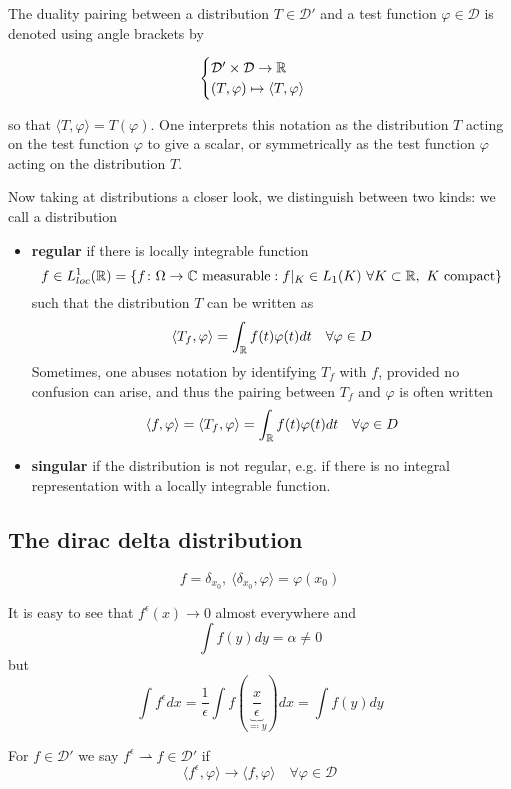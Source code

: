 The duality pairing between a distribution $T \in \mathcal{D}'$ and a test function $\varphi \in \mathcal{D}$ is denoted using angle brackets by

	\[ \begin{cases} \mathcal{D}' \times \mathcal{D} \to \mathbb{R} \\ (T, \varphi) \mapsto \langle T, \varphi \rangle \end{cases} \]
	
so that $\langle T , \varphi \rangle = T(\varphi)$. One interprets this notation as the distribution $T$ acting on the test function $\varphi$ to give a scalar, or symmetrically as the test function $\varphi$ acting on the distribution $T$.	
\newline

Now taking at distributions a closer look, we distinguish between two kinds:
we call a distribution 
\begin{itemize}
	\item \textbf{regular} if there is locally integrable function 
		\[ f \in L_{loc}^{1}(\mathbb{R}) = \{ f \colon \Omega \to \mathbb{C} \text{ measurable} : f|_{K} \in L_{1}(K) ~ \forall K \subset \mathbb{R}, ~K \text{ compact} \} \]
		such that the distribution $T$ can be written as 
		\[ \langle T_{f} , \varphi \rangle = \int_{\mathbb{R}} f(t) \varphi(t) dt \quad \forall \varphi \in D \]
		Sometimes, one abuses notation by identifying $T_{f}$ with $f$, provided no confusion can arise, and thus the pairing between $T_{f}$ and $\varphi$ is often written
		\[ \langle f, \varphi \rangle = \langle T_{f} , \varphi \rangle = \int_{\mathbb{R}} f(t) \varphi(t) dt \quad \forall \varphi \in D \]
	\item \textbf{singular} if the distribution is not regular, e.g. if there is no integral representation with a locally integrable function.
\end{itemize}

\subsection{The dirac delta distribution}

	\[ f = \delta_{x_{0}}, ~ \langle \delta_{x_{0}} , \varphi \rangle = \varphi(x_{0}) \]
	
It is easy to see that $f^{\epsilon}(x) \rightarrow 0$ almost everywhere and
	\[ \int f(y) dy = \alpha \neq 0 \]
but
	\[ \int f^{\epsilon} dx = \frac{1}{\epsilon} \int f(\underbrace{\frac{x}{\epsilon}}_{\eqqcolon y}) dx = \int f(y) dy \]

\begin{definition}
	For $f \in \mathcal{D}'$ we say $f^{\epsilon} \rightharpoonup f \in \mathcal{D}'$ if 
		\[ \langle f^{\epsilon} , \varphi \rangle \rightarrow \langle f , \varphi \rangle \quad \forall \varphi \in \mathcal{D} \]
\end{definition}

